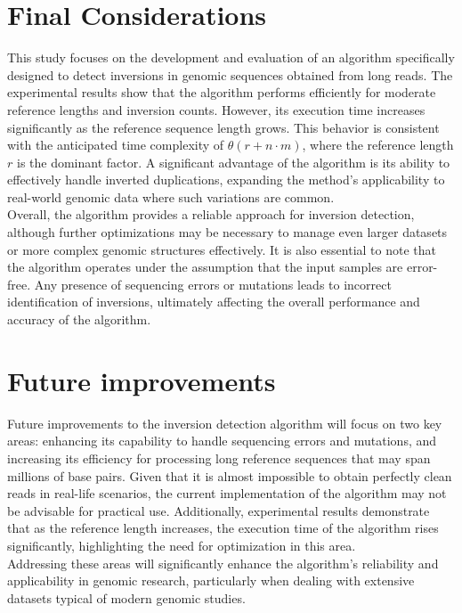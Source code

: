 \section{Final Considerations}

This study focuses on the development and evaluation of an algorithm specifically designed to detect inversions in genomic sequences obtained from long reads. The experimental results show that the algorithm performs efficiently for moderate reference lengths and inversion counts. However, its execution time increases significantly as the reference sequence length grows. This behavior is consistent with the anticipated time complexity of \( \theta(r + n \cdot m) \), where the reference length \( r \) is the dominant factor. A significant advantage of the algorithm is its ability to effectively handle inverted duplications, expanding the method's applicability to real-world genomic data where such variations are common. \\
Overall, the algorithm provides a reliable approach for inversion detection, although further optimizations may be necessary to manage even larger datasets or more complex genomic structures effectively. It is also essential to note that the algorithm operates under the assumption that the input samples are error-free. Any presence of sequencing errors or mutations leads to incorrect identification of inversions, ultimately affecting the overall performance and accuracy of the algorithm.  

\section{Future improvements}

Future improvements to the inversion detection algorithm will focus on two key areas: enhancing its capability to handle sequencing errors and mutations, and increasing its efficiency for processing long reference sequences that may span millions of base pairs. Given that it is almost impossible to obtain perfectly clean reads in real-life scenarios, the current implementation of the algorithm may not be advisable for practical use. Additionally, experimental results demonstrate that as the reference length increases, the execution time of the algorithm rises significantly, highlighting the need for optimization in this area. \\
Addressing these areas will significantly enhance the algorithm's reliability and applicability in genomic research, particularly when dealing with extensive datasets typical of modern genomic studies.  